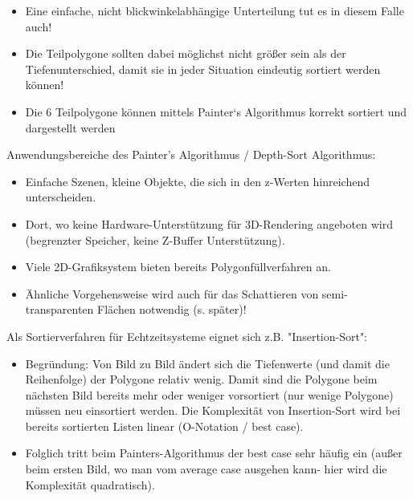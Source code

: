 \documentclass[10pt,landscape]{article}
\begin{document}
\begin{multicols}{3}

\begin{itemize}
  \item Eine einfache, nicht blickwinkelabhängige Unterteilung tut es in diesem Falle auch!
  \item Die Teilpolygone sollten dabei möglichst nicht größer sein als der Tiefenunterschied, damit sie in jeder Situation eindeutig sortiert werden können!
  \item Die 6 Teilpolygone können mittels Painter‘s Algorithmus korrekt sortiert und dargestellt werden
\end{itemize}

Anwendungsbereiche des Painter's Algorithmus / Depth-Sort Algorithmus:
\begin{itemize}
  \item Einfache Szenen, kleine Objekte, die sich in den z-Werten hinreichend unterscheiden.
  \item Dort, wo keine Hardware-Unterstützung für 3D-Rendering angeboten wird (begrenzter Speicher, keine Z-Buffer Unterstützung).
  \item Viele 2D-Grafiksystem bieten bereits Polygonfüllverfahren an.
  \item Ähnliche Vorgehensweise wird auch für das Schattieren von semi-transparenten Flächen notwendig (s. später)!
\end{itemize}

Als Sortierverfahren für Echtzeitsysteme eignet sich z.B. "Insertion-Sort":
\begin{itemize}
  \item Begründung: Von Bild zu Bild ändert sich die Tiefenwerte (und damit die Reihenfolge) der Polygone relativ wenig. Damit sind die Polygone beim nächsten Bild bereits mehr oder weniger vorsortiert (nur wenige Polygone) müssen neu einsortiert werden. Die Komplexität von Insertion-Sort wird bei bereits sortierten Listen linear (O-Notation / best case).
  \item Folglich tritt beim Painters-Algorithmus der best case sehr häufig ein (außer beim ersten Bild, wo man vom average case ausgehen kann- hier wird die Komplexität quadratisch).
\end{itemize}


\end{multicols}
\end{document}
